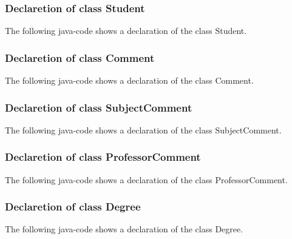 \documentclass[a4paper, oneside]{article}
\begin{document}
\subsubsection{Declaretion of class Student}
The following java-code shows a declaration of the class Student.
\vspace{2mm}

\vspace{5mm}


\subsubsection{Declaretion of class Comment}
The following java-code shows a declaration of the class Comment.
\vspace{2mm}

\vspace{5mm}


\subsubsection{Declaretion of class SubjectComment}
The following java-code shows a declaration of the class SubjectComment.
\vspace{2mm}

\vspace{5mm}


\subsubsection{Declaretion of class ProfessorComment}
The following java-code shows a declaration of the class ProfessorComment.
\vspace{2mm}

\vspace{5mm}


\subsubsection{Declaretion of class Degree}
The following java-code shows a declaration of the class Degree.
\vspace{2mm}

\vspace{5mm}
\end{document}
